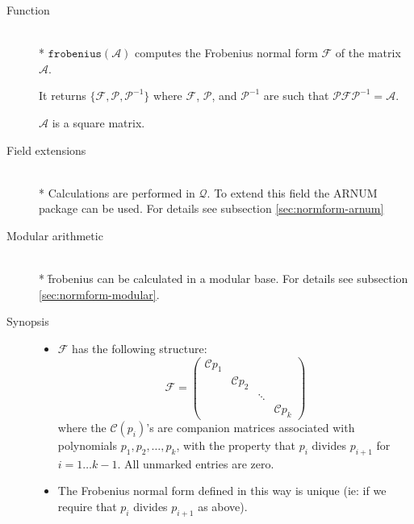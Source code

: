 \begin{description}
\item[Function]\mbox{}\\*
$\mathtt{frobenius}(\mathcal{A})$ computes the Frobenius normal form
$\mathcal{F}$ of the matrix $\mathcal{A}$.

It returns $\{\mathcal{F}, \mathcal{P}, \mathcal{P}^{-1}\}$ where $\mathcal{F}$,
$\mathcal{P}$, and $\mathcal{P}^{-1}$ are such that $\mathcal{P F P}^{-1} =
\mathcal{A}$.

$\mathcal{A}$ is a square matrix.

\item[Field extensions]\mbox{}\\*
Calculations are performed in $\mathcal{Q}$. To extend this field the
{\small ARNUM} package can be used. For details see subsection \ref{sec:normform-arnum}

\item[Modular arithmetic]\mbox{}\\*
%
\f{frobenius} can be calculated in a modular base. For details see
subsection \ref{sec:normform-modular}.

\item[Synopsis]

\begin{itemize}
\item $\mathcal{F}$ has the following structure:
      \[
      \mathcal{F} = \begin{pmatrix} \mathcal{C}{p_{1}} &  &  &
      \\  & \mathcal{C}{p_{2}} &  &  \\  &  & \ddots &  \\  &  &  &
      \mathcal{C}{p_{k}} \end{pmatrix}
      \]
      where the $\mathcal{C}({p_{i}})$'s are companion matrices
      associated with polynomials $p_{1}, p_{2},\ldots, p_{k}$,
      with the property that $p_{i}$ divides
      $p_{i+1}$ for $i =1\ldots k-1$. All unmarked entries are
      zero.

\item The Frobenius normal form defined in this way is unique (ie: if
      we require that $p_{i}$ divides $p_{i+1}$ as above).
\end{itemize}


\end{description}
